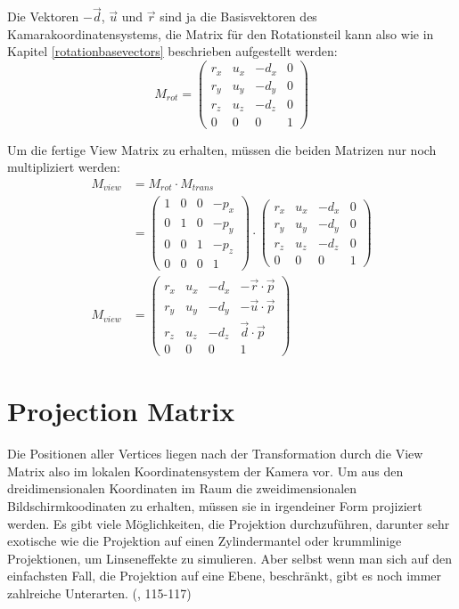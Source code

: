 Die Vektoren $-\vec d$, $\vec u$ und $\vec r$ sind ja die Basisvektoren des Kamarakoordinatensystems, die Matrix für den Rotationsteil kann also wie in Kapitel \ref{rotationbasevectors} beschrieben aufgestellt werden:
\begin{equation}
 M_{rot} =
 \begin{pmatrix}
  r_x & u_x & -d_x & 0 \\
  r_y & u_y & -d_y & 0 \\
  r_z & u_z & -d_z & 0 \\
  0 & 0 & 0 & 1
 \end{pmatrix}
\end{equation}

Um die fertige View Matrix zu erhalten, müssen die beiden Matrizen nur noch multipliziert werden:
\begin{equation}
\begin{split}
 M_{view} &= M_{rot} \cdot M_{trans} \\
 &=
 \begin{pmatrix}
  1 & 0 & 0 & -p_x \\
  0 & 1 & 0 & -p_y \\
  0 & 0 & 1 & -p_z \\
  0 & 0 & 0 & 1
 \end{pmatrix} \cdot
 \begin{pmatrix}
  r_x & u_x & -d_x & 0 \\
  r_y & u_y & -d_y & 0 \\
  r_z & u_z & -d_z & 0 \\
  0 & 0 & 0 & 1
 \end{pmatrix} \\
 M_{view} &=
 \begin{pmatrix}
  r_x & u_x & -d_x & -\vec r \cdot \vec p \\
  r_y & u_y & -d_y & -\vec u \cdot \vec p \\
  r_z & u_z & -d_z & \vec d \cdot \vec p \\
  0 & 0 & 0 & 1
 \end{pmatrix}
\end{split}
\end{equation}

\section{Projection Matrix}
\label{projection}
Die Positionen aller Vertices liegen nach der Transformation durch die View Matrix also im lokalen Koordinatensystem der Kamera vor. Um aus den dreidimensionalen Koordinaten im Raum die zweidimensionalen Bildschirmkoodinaten zu erhalten, müssen sie in irgendeiner Form projiziert werden. Es gibt viele Möglichkeiten, die Projektion durchzuführen, darunter sehr exotische wie die Projektion auf einen Zylindermantel oder krummlinige Projektionen, um Linseneffekte zu simulieren. Aber selbst wenn man sich auf den einfachsten Fall, die Projektion auf eine Ebene, beschränkt, gibt es noch immer zahlreiche Unterarten. (\vgl \citep{script:spain}, 115-117)

